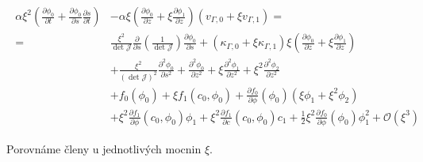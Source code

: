 \begin{align}
    \begin{split}
        \alpha \xi^2\left( \frac{\partial \phi_0}{\partial t} + \frac{\partial \phi_0}{\partial s}\frac{\partial s}{\partial t}\right) &- \alpha \xi \left( \frac{\partial \phi_0}{\partial z} + \xi \frac{\partial \phi_1}{\partial z}\right)\left(v_{\Gamma, 0}+ \xi v_{\Gamma, 1}\right) =\\
        =&\frac{\xi^2}{\det \mathcal{J}} \frac{\partial}{\partial s} \left(\frac{1}{\det \mathcal{J}}\right) \frac{\partial \phi_0}{\partial s} + \left(\kappa_{\Gamma, 0} + \xi\kappa_{\Gamma,1}\right) \xi \left(\frac{\partial \phi_0}{\partial z} + \xi \frac{\partial \phi_1}{\partial z} \right)\\
        &+ \frac{\xi^2}{\left(\det \mathcal{J}\right)^2}\frac{\partial^2 \phi_0}{\partial s^2} + \frac{\partial^2 \phi_0}{\partial z^2} + \xi\frac{\partial^2 \phi_1}{\partial z^2} + \xi^2\frac{\partial^2 \phi_2}{\partial z^2}\\
        & + f_0(\phi_0) + \xi f_1(c_0, \phi_0) + \frac{\partial f_0}{\partial \phi}(\phi_0)(\xi \phi_1 + \xi^2 \phi_2)\\
        &+ \xi^2 \frac{\partial f_1}{\partial \phi}(c_0, \phi_0) \phi_1 + \xi^2\frac{\partial f_1}{\partial c}(c_0, \phi_0) c_1 + \frac{1}{2}\xi^2\frac{\partial f_0}{\partial \phi}(\phi_0)\phi_1^2 + \mathcal{O}(\xi^3)
    \end{split}\\
    \begin{split}
    \end{split}
\end{align}
Porovnáme členy u jednotlivých mocnin \(\xi\).
